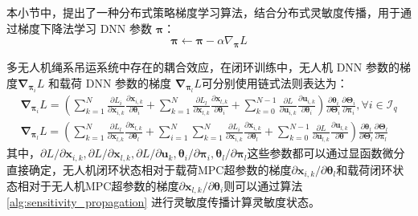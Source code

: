 \documentclass[lang=chs, degree=master, blindreview=false, winfonts=true]{yanputhesis}
\begin{document}
本小节中，提出了一种分布式策略梯度学习算法，结合分布式灵敏度传播，用于通过梯度下降法学习 DNN 参数 $\bm \pi$：
\begin{equation}
    \bm \pi\leftarrow \bm \pi-\alpha\nabla_{\bm \pi}L
	\label{6}
\end{equation}

多无人机绳系吊运系统中存在的耦合效应，在闭环训练中，无人机 DNN 参数的梯度\( \bm{\nabla}_ {\bm \pi_i}  L \) 和载荷 DNN 参数的梯度 \( \bm{\nabla}_ {\bm \pi_l}  L \)可分别使用链式法则表达为：
\begin{equation}
	\begin{gathered}
		\bm{\nabla}_ {\bm \pi_i}  L = \left(\sum_{k=1}^{N} \frac{\partial L_i}{\partial \bm x_{i,k}} \frac{\partial \bm x_{i,k}}{\partial \bm \theta_i} + \sum_{k=1}^{N} \frac{\partial L_l}{\partial \bm x_{l,k}} \frac{\partial \bm x_{l,k}}{\partial \bm \theta_i} +\sum_{k=0}^{N-1} \frac{\partial L}{\partial \bm u_{i,k}} \frac{\partial \bm u_{i,k}}{\partial \bm \theta_i}\right)\frac{\partial\boldsymbol{\theta}_{i}}{\partial\boldsymbol{\Theta}_{i}}\frac{\partial\boldsymbol{\Theta}_{i}}{\partial\boldsymbol{\pi}_{i}},\forall i\in\mathcal{I}_q\\
		\bm{\nabla}_ {\bm \pi_l} L = \left(\sum_{k=1}^{N} \frac{\partial L_l}{\partial \bm x_{l,k}} \frac{\partial \bm x_{l,k}}{\partial \bm \theta_l} +\sum_{i=1}^{N} \sum_{k=1}^{N} \frac{\partial L_i}{\partial \bm x_{i,k}} \frac{\partial \bm x_{i,k}}{\partial \bm \theta_l} + \sum_{k=0}^{N-1} \frac{\partial L}{\partial \bm u_{l,k}} \frac{\partial \bm u_{l,k}}{\partial \bm \theta}\right)\frac{\partial\boldsymbol{\theta}_{l}}{\partial\boldsymbol{\Theta}_{l}}\frac{\partial\boldsymbol{\Theta}_{l}}{\partial\boldsymbol{\pi}_{l}}
	\end{gathered}
	\label{7}
\end{equation}
其中，${\partial L}/{\partial \bm x_{i,k}} , {\partial L}/{\partial \bm x_{l,k}} , {\partial L}/{\partial \bm u_k} , {\boldsymbol{\theta}_i}/{\partial\boldsymbol{\pi}_i} , {\boldsymbol{\theta}_l}/{\partial\boldsymbol{\pi}_l}$这些参数都可以通过显函数微分直接确定，无人机闭环状态相对于载荷MPC超参数的梯度\({\partial \bm x_{i,k}}/ {\partial \bm \theta_l}\)和载荷闭环状态相对于无人机MPC超参数的梯度\({\partial \bm x_{l,k}}/{\partial \bm \theta_i}\)则可以通过算法 \ref{alg:sensitivity_propagation} 进行灵敏度传播计算灵敏度状态。
\end{document}
